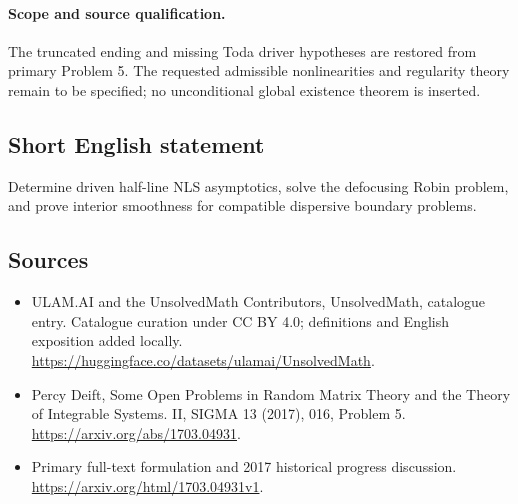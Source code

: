 \documentclass[11pt]{article}
\begin{document}
\paragraph{Scope and source qualification.}The truncated ending and missing Toda driver hypotheses are restored from primary Problem 5. The requested admissible nonlinearities and regularity theory remain to be specified; no unconditional global existence theorem is inserted.
\subsection{Short English statement}
Determine driven half-line NLS asymptotics, solve the defocusing Robin problem, and prove interior smoothness for compatible dispersive boundary problems.
\subsection{Sources}
\begin{itemize}
\item[\hypertarget{source:statement:1}{S1}] ULAM.AI and the UnsolvedMath Contributors, UnsolvedMath, catalogue entry. Catalogue curation under CC BY 4.0; definitions and English exposition added locally.
\url{https://huggingface.co/datasets/ulamai/UnsolvedMath}.
\item[\hypertarget{source:statement:2}{S2}] Percy Deift, Some Open Problems in Random Matrix Theory and the Theory of Integrable Systems. II, SIGMA 13 (2017), 016, Problem 5.
\url{https://arxiv.org/abs/1703.04931}.
\item[\hypertarget{source:statement:3}{S3}] Primary full-text formulation and 2017 historical progress discussion.
\url{https://arxiv.org/html/1703.04931v1}.
\end{itemize}
\label{end:statement}
\end{document}
